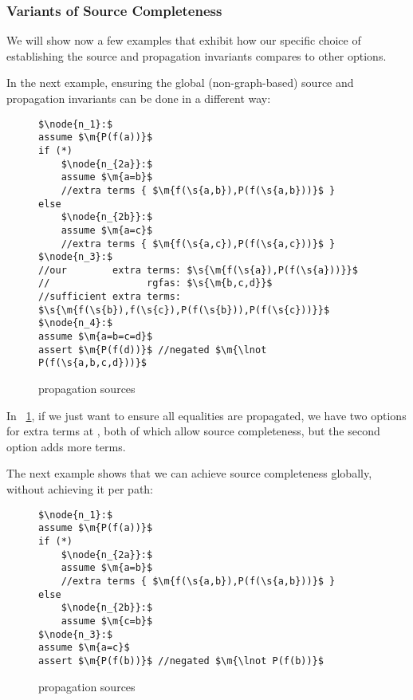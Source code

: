 \newpage
\subsubsection*{Variants of Source Completeness}
We will show now a few examples that exhibit how our specific choice of establishing the source and propagation invariants compares to other options.

In the next example, ensuring the global (non-graph-based) source and propagation invariants can be done in a different way:
\begin{figure}[H]
\begin{lstlisting}
$\node{n_1}:$
assume $\m{P(f(a))}$
if (*)
	$\node{n_{2a}}:$
	assume $\m{a=b}$
	//extra terms { $\m{f(\s{a,b}),P(f(\s{a,b}))}$ }
else
	$\node{n_{2b}}:$
	assume $\m{a=c}$
	//extra terms { $\m{f(\s{a,c}),P(f(\s{a,c}))}$ }
$\node{n_3}:$
//our        extra terms: $\s{\m{f(\s{a}),P(f(\s{a}))}}$
//                 rgfas: $\s{\m{b,c,d}}$
//sufficient extra terms: $\s{\m{f(\s{b}),f(\s{c}),P(f(\s{b})),P(f(\s{c}))}}$
$\node{n_4}:$
assume $\m{a=b=c=d}$
assert $\m{P(f(d))}$ //negated $\m{\lnot P(f(\s{a,b,c,d}))}$
\end{lstlisting}
\caption{propagation sources}
\label{snippet3.16d}
\end{figure}
In ~\ref{snippet3.16d}, if we just want to ensure all equalities are propagated, we have two options for extra terms at , both of which allow source completeness, but the second option adds more terms. 

The next example shows that we can achieve source completeness globally, without achieving it per path:
\begin{figure}[H]
\begin{lstlisting}
$\node{n_1}:$
assume $\m{P(f(a))}$
if (*)
	$\node{n_{2a}}:$
	assume $\m{a=b}$
	//extra terms { $\m{f(\s{a,b}),P(f(\s{a,b}))}$ }
else
	$\node{n_{2b}}:$
	assume $\m{c=b}$
$\node{n_3}:$
assume $\m{a=c}$
assert $\m{P(f(b))}$ //negated $\m{\lnot P(f(b))}$
\end{lstlisting}
\caption{propagation sources}
\label{snippet3.16e}
\end{figure}


